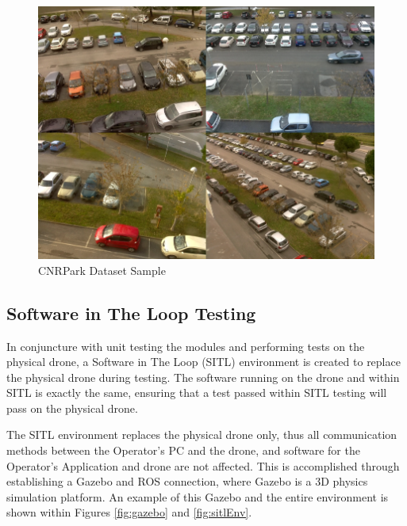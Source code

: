 \documentclass[12pt, titlepage]{article}
\begin{document}
\begin{figure}[h!]
  \begin{center} 
  \caption{CNRPark Dataset Sample}
  \label{CNRParkSample}
        \includegraphics[width=1\textwidth]{VnVPlan/CNRParkDataset.png}
  \end{center}
\end{figure}

\clearpage

\subsection{Software in The Loop Testing}
\label{subsec:sitl}

In conjuncture with unit testing the modules and performing tests on the physical drone, a Software in The Loop (SITL) environment is created to replace the physical drone during testing. The software running on the drone and within SITL is exactly the same, ensuring that a test passed within SITL testing will pass on the physical drone.

The SITL environment replaces the physical drone only, thus all communication methods between the Operator's PC and the drone, and software for the Operator's Application and drone are not affected. This is accomplished through establishing a Gazebo and ROS connection, where Gazebo is a 3D physics simulation platform. An example of this Gazebo and the entire environment is shown within Figures \ref{fig:gazebo} and \ref{fig:sitlEnv}.
\end{document}
